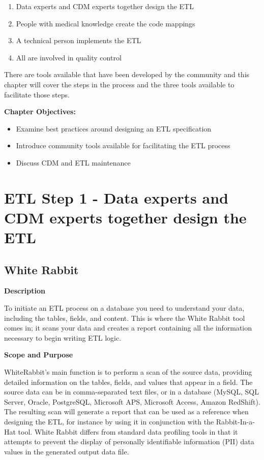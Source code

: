 \documentclass[11pt]{book}
\providecommand{\tightlist}{%
  \setlength{\itemsep}{0pt}\setlength{\parskip}{0pt}}
\theoremstyle{definition}
\theoremstyle{definition}
\theoremstyle{definition}
\theoremstyle{remark}
\begin{document}
\begin{enumerate}
\def\labelenumi{\arabic{enumi}.}
\tightlist
\item
  Data experts and CDM experts together design the ETL
\item
  People with medical knowledge create the code mappings
\item
  A technical person implements the ETL
\item
  All are involved in quality control
\end{enumerate}

There are tools available that have been developed by the community and this chapter will cover the steps in the process and the three tools available to facilitate those steps.

\textbf{Chapter Objectives:}

\begin{itemize}
\tightlist
\item
  Examine best practices around designing an ETL specification
\item
  Introduce community tools available for facilitating the ETL process
\item
  Discuss CDM and ETL maintenance
\end{itemize}

\hypertarget{etl-step-1---data-experts-and-cdm-experts-together-design-the-etl}{%
\section{ETL Step 1 - Data experts and CDM experts together design the ETL}\label{etl-step-1---data-experts-and-cdm-experts-together-design-the-etl}}

\hypertarget{white-rabbit}{%
\subsection{White Rabbit}\label{white-rabbit}}

\textbf{Description}

To initiate an ETL process on a database you need to understand your data, including the tables, fields, and content. This is where the White Rabbit tool comes in; it scans your data and creates a report containing all the information necessary to begin writing ETL logic.

\textbf{Scope and Purpose}

WhiteRabbit's main function is to perform a scan of the source data, providing detailed information on the tables, fields, and values that appear in a field. The source data can be in comma-separated text files, or in a database (MySQL, SQL Server, Oracle, PostgreSQL, Microsoft APS, Microsoft Access, Amazon RedShift). The resulting scan will generate a report that can be used as a reference when designing the ETL, for instance by using it in conjunction with the Rabbit-In-a-Hat tool. White Rabbit differs from standard data profiling tools in that it attempts to prevent the display of personally identifiable information (PII) data values in the generated output data file.
\end{document}
